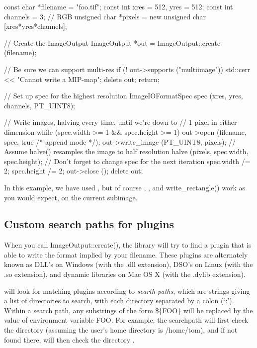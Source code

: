 \begin{code}
        const char *filename = "foo.tif";
        const int xres = 512, yres = 512;
        const int channels = 3;  // RGB
        unsigned char *pixels = new unsigned char [xres*yres*channels];

        // Create the ImageOutput
        ImageOutput *out = ImageOutput::create (filename);

        // Be sure we can support multi-res
        if (! out->supports ("multiimage")) {
            std::cerr << "Cannot write a MIP-map\n";
            delete out;
            return;
        }

        // Set up spec for the highest resolution
        ImageIOFormatSpec spec (xres, yres, channels, PT_UINT8);

        // Write images, halving every time, until we're down to
        // 1 pixel in either dimension
        while (spec.width >= 1 && spec.height >= 1) {
            out->open (filename, spec, true /* append mode */);
            out->write_image (PT_UINT8, pixels);
            // Assume halve() resamples the image to half resolution
            halve (pixels, spec.width, spec.height);
            // Don't forget to change spec for the next iteration
            spec.width /= 2;
            spec.height /= 2;
        }
        out->close ();
        delete out;
\end{code}

In this example, we have used \writeimage, but of course \writescanline,
\writetile, and {\cf write_rectangle()} work as you would expect, on the
current subimage.

\subsection{Custom search paths for plugins}
\label{sec:imageoutput:searchpaths}

When you call {\cf ImageOutput::create()}, the \product library will try
to find a plugin that is able to write the format implied by your
filename.  These plugins are alternately known as DLL's on Windows (with
the {\cf .dll} extension), DSO's on Linux (with the {\cf .so}
extension), and dynamic libraries on Mac OS X (with the {\cf .dylib}
extension).  

\product will look for matching plugins according to
\emph{searth paths}, which are strings giving a list of directories to
search, with each directory separated by a colon (`{\cf :}').  Within
a search path, any
substrings of the form {\cf \$\{FOO\}} will be replaced
by the value of environment variable {\cf FOO}.  For
example, the searchpath 
will first check the directory  (assuming the
user's home directory is {\cf /home/tom}), and if not
found there, will then check the directory .

